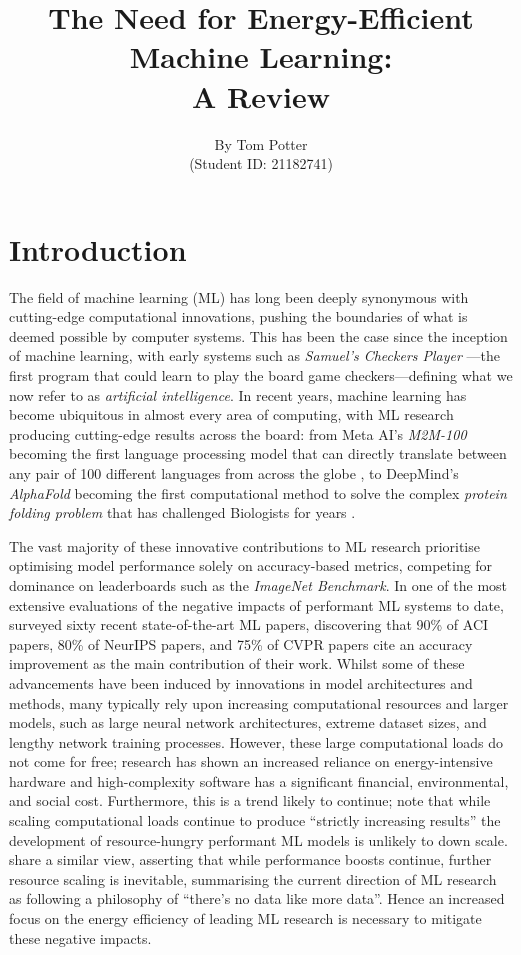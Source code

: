 \documentclass[a4paper, 12pt]{article}
\title{The Need for Energy-Efficient Machine Learning: \\ A Review}
\author{By Tom Potter \\ (Student ID: 21182741)}
\date{}
\begin{document}
    \maketitle

    \section{Introduction}

    The field of machine learning (ML) has long been deeply synonymous with cutting-edge computational innovations, pushing the boundaries of what is deemed possible by computer systems. This has been the case since the inception of machine learning, with early systems such as \emph{Samuel's Checkers Player} \cite{samuel-1959}---the first program that could learn to play the board game checkers---defining what we now refer to as \emph{artificial intelligence}. In recent years, machine learning has become ubiquitous in almost every area of computing, with ML research producing cutting-edge results across the board: from Meta AI's \emph{M2M-100} becoming the first language processing model that can directly translate between any pair of 100 different languages from across the globe \cite{fan-2020a}, to DeepMind's \emph{AlphaFold} becoming the first computational method to solve the complex \emph{protein folding problem} that has challenged Biologists for years \cite{jumper-2021}. 

    The vast majority of these innovative contributions to ML research prioritise optimising model performance solely on accuracy-based metrics, competing for dominance on leaderboards such as the \emph{ImageNet Benchmark}. In one of the most extensive evaluations of the negative impacts of performant ML systems to date,  surveyed sixty recent state-of-the-art ML papers, discovering that 90\% of ACI papers, 80\% of NeurIPS papers, and 75\% of CVPR papers cite an accuracy improvement as the main contribution of their work. Whilst some of these advancements have been induced by innovations in model architectures and methods, many typically rely upon increasing computational resources and larger models, such as large neural network architectures, extreme dataset sizes, and lengthy network training processes. However, these large computational loads do not come for free; research has shown an increased reliance on energy-intensive hardware and high-complexity software has a significant financial, environmental, and social cost. Furthermore, this is a trend likely to continue;  note that while scaling computational loads continue to produce ``strictly increasing results” the development of resource-hungry performant ML models is unlikely to down scale.  share a similar view, asserting that while performance boosts continue, further resource scaling is inevitable, summarising the current direction of ML research as following a philosophy of ``there's no data like more data”. Hence an increased focus on the energy efficiency of leading ML research is necessary to mitigate these negative impacts.
\end{document}
